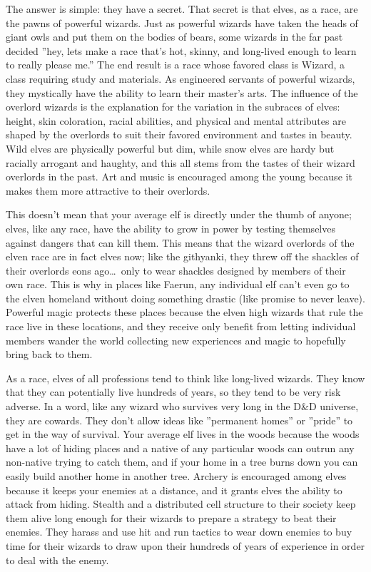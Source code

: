 The answer is simple: they have a secret. That secret is that elves, as a race, are the pawns of powerful wizards. Just as powerful wizards have taken the heads of giant owls and put them on the bodies of bears, some wizards in the far past decided ''hey, lets make a race that's hot, skinny, and long-lived enough to learn to really please me.'' The end result is a race whose favored class is Wizard, a class requiring study and materials. As engineered servants of powerful wizards, they mystically have the ability to learn their master's arts. The influence of the overlord wizards is the explanation for the variation in the subraces of elves: height, skin coloration, racial abilities, and physical and mental attributes are shaped by the overlords to suit their favored environment and tastes in beauty. Wild elves are physically powerful but dim, while snow elves are hardy but racially arrogant and haughty, and this all stems from the tastes of their wizard overlords in the past. Art and music is encouraged among the young because it makes them more attractive to their overlords.

This doesn't mean that your average elf is directly under the thumb of anyone; elves, like any race, have the ability to grow in power by testing themselves against dangers that can kill them. This means that the wizard overlords of the elven race are in fact elves now; like the githyanki, they threw off the shackles of their overlords eons ago\ldots\ only to wear shackles designed by members of their own race. This is why in places like Faerun, any individual elf can't even go to the elven homeland without doing something drastic (like promise to never leave). Powerful magic protects these places because the elven high wizards that rule the race live in these locations, and they receive only benefit from letting individual members wander the world collecting new experiences and magic to hopefully bring back to them.

As a race, elves of all professions tend to think like long-lived wizards. They know that they can potentially live hundreds of years, so they tend to be very risk adverse. In a word, like any wizard who survives very long in the D\&D universe, they are cowards. They don't allow ideas like ''permanent homes'' or ''pride'' to get in the way of survival. Your average elf lives in the woods because the woods have a lot of hiding places and a native of any particular woods can outrun any non-native trying to catch them, and if your home in a tree burns down you can easily build another home in another tree. Archery is encouraged among elves because it keeps your enemies at a distance, and it grants elves the ability to attack from hiding. Stealth and a distributed cell structure to their society keep them alive long enough for their wizards to prepare a strategy to beat their enemies. They harass and use hit and run tactics to wear down enemies to buy time for their wizards to draw upon their hundreds of years of experience in order to deal with the enemy.

